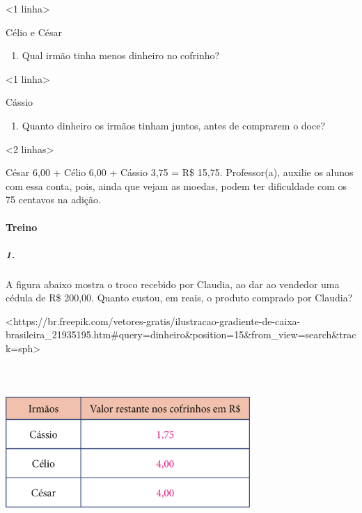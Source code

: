 \textless{}1 linha\textgreater{}

Célio e César

\begin{enumerate}
\def\labelenumi{\alph{enumi})}
\item
  Qual irmão tinha menos dinheiro no cofrinho?
\end{enumerate}

\textless{}1 linha\textgreater{}

Cássio

\begin{enumerate}
\def\labelenumi{\alph{enumi})}
\item
  Quanto dinheiro os irmãos tinham juntos, antes de comprarem o doce?
\end{enumerate}

\textless{}2 linhas\textgreater{}

César 6,00 + Célio 6,00 + Cássio 3,75 = R\$ 15,75. Professor(a), auxilie
os alunos com essa conta, pois, ainda que vejam as moedas, podem ter
dificuldade com os 75 centavos na adição.

\paragraph{Treino}\label{treino-4}

\subparagraph{1.}\label{section-65}

A figura abaixo mostra o troco recebido por Claudia, ao dar ao vendedor
uma cédula de R\$ 200,00. Quanto custou, em reais, o produto comprado
por Claudia?

\textless{}https://br.freepik.com/vetores-gratis/ilustracao-gradiente-de-caixa-brasileira\_21935195.htm\#query=dinheiro\&position=15\&from\_view=search\&track=sph\textgreater{}

\includegraphics[width=3.65497in,height=2.60417in]{media/image77.png}

